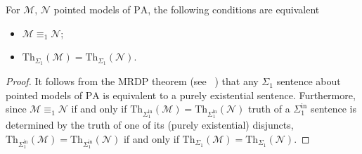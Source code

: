 \documentclass[11pt]{amsart}
\newcommand{\mc}[1]{\mathcal{#1}}
\newcommand{\Sinf}[1]{\Sigma^{\mathrm{in}}_{#1}}
\newcommand{\PA}{\mathrm{PA}}
\newcommand{\Th}{\mathrm{Th}}
\theoremstyle{remark}
\begin{document}
\begin{proposition}\label{prop:baseCase}
    For $\mc{M}$, $\mc{N}$ pointed models of $\PA$, the following conditions are equivalent
    \begin{itemize}
        \item $\mc{M}\equiv_1 \mc{N}$;
        \item $\Th_{\Sigma_1}(\mc{M}) = \Th_{\Sigma_1}(\mc{N})$.
    \end{itemize}
\end{proposition}
\begin{proof}
	It follows from the MRDP theorem (see ~\cite[Result 7.8]{Kaye}) that any $\Sigma_1$ sentence about pointed models of $\PA$ is equivalent to a purely existential sentence. Furthermore, since $\mc M\equiv_1\mc N$ if and only if $\Th_{\Sinf{1}}(\mc M)=\Th_{\Sinf{1}}(\mc N)$ truth of a $\Sinf{1}$ sentence is determined by the truth of one of its (purely existential) disjuncts, $\Th_{\Sinf{1}}(\mc M)=\Th_{\Sinf{1}}(\mc N)$ if and only if $\Th_{\Sigma_1}(\mc M)=\Th_{\Sigma_1}(\mc N)$.
\end{proof}
\end{document}
